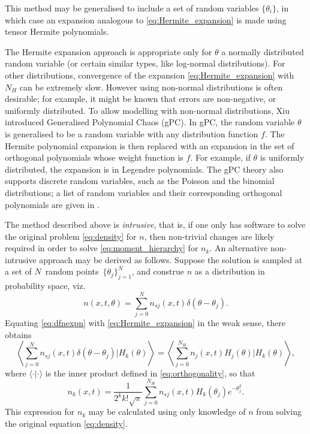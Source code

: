 This method may be generalised to include a set of random variables $\{\theta_i\}$, in which case an expansion analogous to \eqref{eq:Hermite_expansion} is made using tensor Hermite polynomials.

The Hermite expansion approach is appropriate only for $\theta$ a normally distributed random variable (or certain similar types, like log-normal distributions).
For other distributions, convergence of the expansion \eqref{eq:Hermite_expansion} with $N_H$ can be extremely slow.
However using non-normal distributions is often desirable; for example, it might be known that errors are non-negative, or uniformly distributed.
To allow modelling with non-normal distributions, Xiu \cite{xiu04} introduced Generalised Polynomial Chaos (gPC).
In gPC, the random variable $\theta$ is generalised to be a random variable with any distribution function $f$.
The Hermite polynomial expansion is then replaced with an expansion in the set of orthogonal polynomials whose weight function is $f$.
For example, if $\theta$ is uniformly distributed, the expansion is in Legendre polynomials.
The gPC theory also supports discrete random variables, such as the Poisson and the binomial distributions; 
a list of random variables and their corresponding orthogonal polynomials are given in \cite[Table 2.1]{xiu04}.

The method described above is \emph{intrusive}, that is,
if one only has software to solve the original problem \eqref{eq:density} for $n$,
then non-trivial changes are likely required in order to solve \eqref{eq:moment_hierarchy} for $n_k$.
An alternative non-intrusive approach may be derived as follows.
Suppose the solution is sampled at a set of $N$~random
points~$\{\theta_j\}_{j=1}^{N}$,
and construe $n$ as a distribution in probability space, viz.
\begin{equation} \label{eq:dfnexpn}
n(x,t,\theta) = \sum_{j=0}^{N} n_{sj}(x,t)\delta(\theta-\theta_j).
\end{equation}
Equating \eqref{eq:dfnexpn} with \eqref{eq:Hermite_expansion} in the weak sense, there obtains
\begin{equation} \label{eq:hermweak}
\left\langle\sum_{j=0}^{N} n_{sj}(x,t)\delta(\theta-\theta_j) \Bigg|  H_k(\theta)\right\rangle =
\left\langle\sum_{j=0}^{N_H} n_{j}(x,t) H_j (\theta) \Bigg| H_k(\theta)\right\rangle,
\end{equation}
where $\langle\cdot|\cdot \rangle$ is the inner product defined in \eqref{eq:orthogonality}, so that
\begin{equation} \label{eq:hermres}
n_k(x,t) = \frac{1}{2^kk!\sqrt{\pi}}\sum_{j=0}^{N_H} n_{sj}(x,t)H_k(\theta_j) e^{-\theta_j^2}.
\end{equation}
This expression for $n_k$ may be calculated using only knowledge of $n$ from solving the original equation \eqref{eq:density}.

